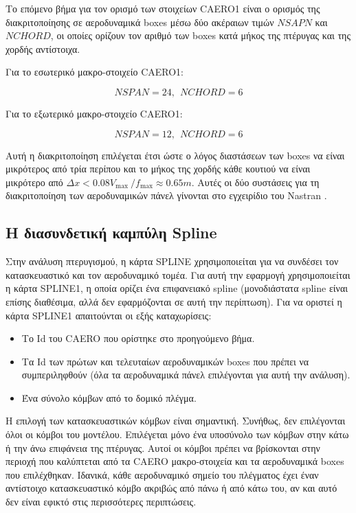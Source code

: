 Το επόμενο βήμα για τον ορισμό των στοιχείων \textlatin{CAERO1} είναι ο ορισμός της διακριτοποίησης σε αεροδυναμικά \textlatin{boxes} μέσω δύο ακέραιων τιμών \(NSAPN\) και \(NCHORD\), οι οποίες ορίζουν τον αριθμό των \textlatin{boxes} κατά μήκος της πτέρυγας και της χορδής αντίστοιχα.

Για το εσωτερικό μακρο-στοιχείο \textlatin{CAERO1}:

\[NSPAN = 24,\ \ NCHORD = 6\]

Για το εξωτερικό μακρο-στοιχείο CAERO1:

\[NSPAN = 12,\ \ NCHORD = 6\]

Αυτή η διακριτοποίηση επιλέγεται έτσι ώστε ο λόγος διαστάσεων των \textlatin{boxes} να είναι μικρότερος από τρία περίπου και το μήκος της χορδής κάθε κουτιού να είναι μικρότερο από \(\Delta x < 0.08V_{\max}\ \text{/}f_{\max} \approx 0.65m\). Αυτές οι δύο συστάσεις για τη διακριτοποίηση των αεροδυναμικών πάνελ γίνονται στο εγχειρίδιο του \textlatin{Nastran} \cite{msc2021}.


\subsection{Η διασυνδετική καμπύλη \textlatin{Spline}} \label{the-spline}

Στην ανάλυση πτερυγισμού, η κάρτα \textlatin{SPLINE} χρησιμοποιείται για να συνδέσει τον κατασκευαστικό και τον αεροδυναμικό τομέα. Για αυτή την εφαρμογή χρησιμοποιείται η κάρτα \textlatin{SPLINE1}, η οποία ορίζει ένα επιφανειακό \textlatin{spline} (μονοδιάστατα \textlatin{spline} είναι επίσης διαθέσιμα, αλλά δεν εφαρμόζονται σε αυτή την περίπτωση). Για να οριστεί η κάρτα \textlatin{SPLINE1} απαιτούνται οι εξής καταχωρίσεις:

\begin{itemize}
\item
  Το \textlatin{Id} του \textlatin{CAERO} που ορίστηκε στο προηγούμενο βήμα.
\item
  Τα \textlatin{Id} των πρώτων και τελευταίων αεροδυναμικών \textlatin{boxes} που πρέπει να συμπεριληφθούν (όλα τα αεροδυναμικά πάνελ επιλέγονται για αυτή την ανάλυση).
\item
  Ένα σύνολο κόμβων από το δομικό πλέγμα.
\end{itemize}

Η επιλογή των κατασκευαστικών κόμβων είναι σημαντική. Συνήθως, δεν επιλέγονται όλοι οι κόμβοι του μοντέλου. Επιλέγεται μόνο ένα υποσύνολο των κόμβων στην κάτω ή την άνω επιφάνεια της πτέρυγας. Αυτοί οι κόμβοι πρέπει να βρίσκονται στην περιοχή που καλύπτεται από τα  \textlatin{CAERO} μακρο-στοιχεία και τα αεροδυναμικά \textlatin{boxes} που επιλέχθηκαν. Ιδανικά, κάθε αεροδυναμικό σημείο του πλέγματος έχει έναν αντίστοιχο κατασκευαστικό κόμβο ακριβώς από πάνω ή από κάτω του, αν και αυτό δεν είναι εφικτό στις περισσότερες περιπτώσεις.


